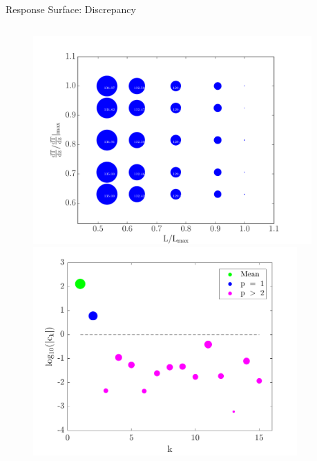 \documentclass[xcolor={x11names,table},compress,svgnames,mathserif]{beamer}
\renewcommand{\(}{\begin{columns}}
\renewcommand{\)}{\end{columns}}
\newcommand{\<}[1]{\begin{column}{#1}}
\renewcommand{\>}{\end{column}}
\begin{document}
\begin{frame}{Response Surface: Discrepancy}
\begin{columns}
\begin{column}{0.48\textwidth}
\begin{center}
\begin{figure}[htbp]
\vspace{-3mm}
  \includegraphics[width=0.95\textwidth]{./Figures/realz_quad300K}
  \\ \vspace{1mm}
  \includegraphics[width=0.9\textwidth]{./Figures/PCspectrum_300}
\end{figure}
\end{center}

\end{column}
\end{columns}

\end{frame}

\end{document}

